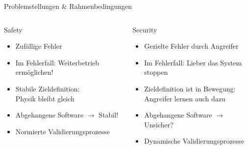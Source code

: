 \begin{frame}[T]{Problemstellungen \& Rahmenbedingungen}
\small
  \begin{columns}[t,fullwidth]
   \hfill
    \begin{column}{.45\linewidth}
      \begin{block}{Safety}
      \begin{itemize}
        \item Zufällige Fehler
        \item Im Fehlerfall: Weiterbetrieb ermöglichen!
        \item Stabile Zieldefinition:\\Physik bleibt gleich
        \item Abgehangene Software $\rightarrow$ Stabil!
        \item Normierte Validierungsprozesse
      \end{itemize}
      \end{block}
    \end{column}
    \hfill
    \begin{column}{.45\linewidth}
      \begin{block}{Security}
      \begin{itemize}
        \item Gezielte Fehler durch Angreifer
        \item Im Fehlerfall: Lieber das System stoppen
        \item Zieldefinition ist in Bewegung:\\Angreifer lernen auch dazu
        \item Abgehangene Software $\rightarrow$ Unsicher?
        \item Dynamische Validierungsprozesse
      \end{itemize}
      \end{block}
    \end{column}
    \hfill
  \end{columns}
\end{frame}

